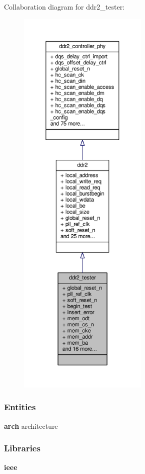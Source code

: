 Collaboration diagram for ddr2\+\_\+tester\+:\nopagebreak
\begin{figure}[H]
\begin{center}
\leavevmode
\includegraphics[height=550pt]{d6/d3a/classddr2__tester__coll__graph}
\end{center}
\end{figure}
\subsubsection*{Entities}
\begin{DoxyCompactItemize}
\item 
{\bf arch} architecture
\end{DoxyCompactItemize}
\subsubsection*{Libraries}
 \begin{DoxyCompactItemize}
\item 
{\bf ieee} 
\end{DoxyCompactItemize}
